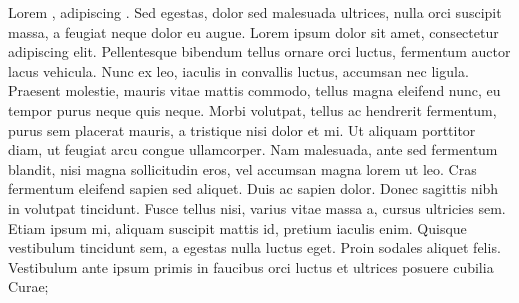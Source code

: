 \documentclass[a4paper]{article}
\begin{document}
    \resumenumbering
    

 


            \pstart
Lorem    ,  adipiscing . Sed egestas, dolor sed malesuada ultrices, nulla orci suscipit massa, a feugiat neque dolor eu augue. Lorem ipsum dolor sit amet, consectetur adipiscing elit. Pellentesque bibendum tellus ornare orci luctus, fermentum auctor lacus vehicula. Nunc ex leo, iaculis in convallis luctus, accumsan nec ligula. Praesent molestie, mauris vitae mattis commodo, tellus magna eleifend nunc, eu tempor purus neque quis neque. Morbi volutpat, tellus ac hendrerit fermentum, purus sem placerat mauris, a tristique nisi dolor et mi. Ut aliquam porttitor diam, ut feugiat arcu congue ullamcorper. Nam malesuada, ante sed fermentum blandit, nisi magna sollicitudin eros, vel accumsan magna lorem ut leo. Cras fermentum eleifend sapien sed aliquet. Duis ac sapien dolor. Donec sagittis nibh in volutpat tincidunt. Fusce tellus nisi, varius vitae massa a, cursus ultricies sem. Etiam ipsum mi, aliquam suscipit mattis id, pretium iaculis enim. Quisque vestibulum tincidunt sem, a egestas nulla luctus eget. Proin sodales aliquet felis. Vestibulum ante ipsum primis in faucibus orci luctus et ultrices posuere cubilia Curae;

        \pend
    \pausenumbering
\end{document}
